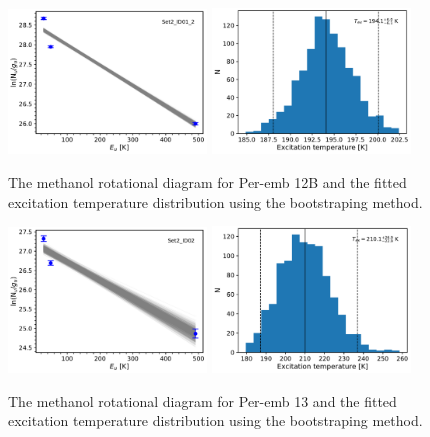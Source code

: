 \documentclass[twocolumn]{aastex62}
\begin{document}
\begin{figure}[htbp!]
  \centering
  \includegraphics[width=0.47\textwidth]{Set2_ID01_2.pdf}
  \includegraphics[width=0.47\textwidth]{Set2_ID01_2_rot_temps.pdf}
  \caption{The methanol rotational diagram for Per-emb 12B and the fitted excitation temperature distribution using the bootstraping method.}
  \label{}
\end{figure}

\begin{figure}[htbp!]
  \centering
  \includegraphics[width=0.47\textwidth]{Set2_ID02.pdf}
  \includegraphics[width=0.47\textwidth]{Set2_ID02_rot_temps.pdf}
  \caption{The methanol rotational diagram for Per-emb 13 and the fitted excitation temperature distribution using the bootstraping method.}
  \label{}
\end{figure}
\end{document}
